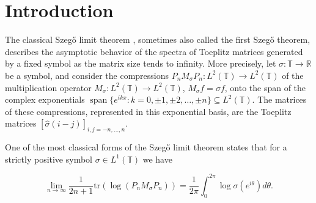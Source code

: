 \documentclass{amsart}
\theoremstyle{definition}
\theoremstyle{remark}
\numberwithin{equation}{section}
\begin{document}
\maketitle










\section{Introduction}

The classical Szeg\H o limit theorem \cite{SZ15}, sometimes also called the first Szeg\H o theorem, describes the asymptotic behavior of the spectra of Toeplitz matrices generated by a fixed symbol as the matrix size tends to infinity. More precisely, let $\sigma:\mathbb{T} \to \mathbb{R}$ be a symbol, and consider the compressions $P_n M_\sigma P_n : L^2(\mathbb{T}) \to L^2(\mathbb{T})$ of the multiplication operator $M_\sigma : L^2(\mathbb{T}) \to L^2(\mathbb{T})$, $M_\sigma f = \sigma f$, onto the span of the complex exponentials $\operatorname{span}\{ e^{ikx} : k = 0, \pm 1, \pm 2, \dots, \pm n \} \subseteq L^2(\mathbb{T})$. The matrices of these compressions, represented in this exponential basis, are the Toeplitz matrices $[\hat{\sigma}(i-j)]_{i,j=-n,\dots,n}$.

 One of the most classical forms of the Szeg\H o limit theorem states that for a strictly positive symbol $\sigma\in L^{1}(\mathbb{T})$ we have 

\begin{equation}\label{Szegolog}
\lim_{n\to\infty}\frac{1}{2n+1}\text{tr}\left(\log\left(P_{n}M_{\sigma}P_{n}\right)\right)=\frac{1}{2\pi}\int_{0}^{2\pi}\log\sigma\left(e^{i\theta}\right)d\theta. \end{equation}
\end{document}
